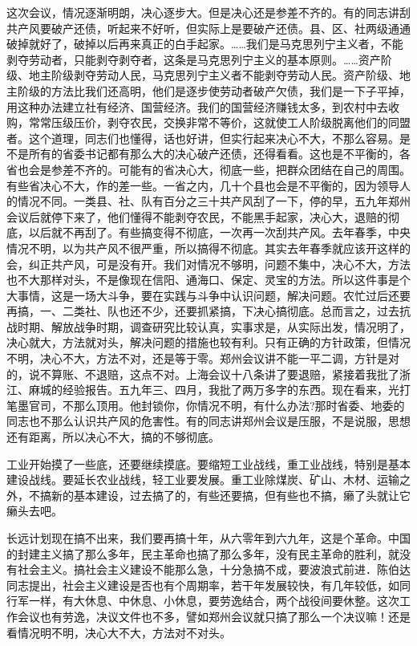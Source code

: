 这次会议，情况逐渐明朗，决心逐步大。但是决心还是参差不齐的。有的同志讲刮共产风要破产还债，听起来不好听，但实际上是要破产还债。县、区、社两级通通破掉就好了，破掉以后再来真正的白手起家。……我们是马克思列宁主义者，不能剥夺劳动者，只能剥夺剥夺者，这条是马克思列宁主义的基本原则。……资产阶级、地主阶级剥夺劳动人民，马克思列宁主义者不能剥夺劳动人民。资产阶级、地主阶级的方法比我们还高明，他们是逐步使劳动者破产欠债，我们是一下子平掉，用这种办法建立社有经济、国营经济。我们的国营经济赚钱太多，到农村中去收购，常常压级压价，剥夺农民，交换非常不等价，这就使工人阶级脱离他们的同盟者。这个道理，同志们也懂得，话也好讲，但实行起来决心不大，不那么容易。是不是所有的省委书记都有那么大的决心破产还债，还得看看。这也是不平衡的，各省也会是参差不齐的。可能有的省决心大，彻底一些，把群众团结在自己的周围。有些省决心不大，作的差一些。一省之内，几十个县也会是不平衡的，因为领导人的情况不同。一类县、社、队有百分之三十共产风刮了一下，停的早，五九年郑州会议后就停下来了，他们懂得不能剥夺农民，不能黑手起家，决心大，退赔的彻底，以后就不再刮了。有些搞变得不彻底，一次再一次刮共产风。去年春季，中央情况不明，以为共产风不很严重，所以搞得不彻底。其实去年春季就应该开这样的会，纠正共产风，可是没有开。我们对情况不够明，问题不集中，决心不大，方法也不大那样对头，不是像现在信阳、通海口、保定、灵宝的方法。所以这件事是个大事情，这是一场大斗争，要在实践与斗争中认识问题，解决问题。农忙过后还要再搞，一、二类社、队也还不少，还要抓紧搞，下决心搞彻底。总而言之，过去抗战时期、解放战争时期，调查研究比较认真，实事求是，从实际出发，情况明了，决心就大，方法就对头，解决问题的措施也较有利。只有正确的方针政策，但情况不明，决心不大，方法不对，还是等于零。郑州会议讲不能一平二调，方针是对的，说不算账、不退赔，这点不对。上海会议十八条讲了要退赔，紧接着我批了浙江、麻城的经验报告。五九年三、四月，我批了两万多字的东西。现在看来，光打笔墨官司，不那么顶用。他封锁你，你情况不明，有什么办法?那时省委、地委的同志也不那么认识共产风的危害性。有的同志讲郑州会议是压服，不是说服，思想还有距离，所以决心不大，搞的不够彻底。

工业开始摸了一些底，还要继续摸底。要缩短工业战线，重工业战线，特别是基本建设战线。要延长农业战线，轻工业要发展。重工业除煤炭、矿山、木材、运输之外，不搞新的基本建设，过去搞了的，有些还要搞，但有些也不搞，癞了头就让它癞头去吧。

长远计划现在搞不出来，我们要再搞十年，从六零年到六九年，这是个革命。中国的封建主义搞了那么多年，民主革命也搞了那么多年，没有民主革命的胜利，就没有社会主义。搞社会主义建设不能那么急，十分急搞不成，要波浪式前进．陈伯达同志提出，社会主义建设是否也有个周期率，若干年发展较快，有几年较低，如同行军一样，有大休息、中休息、小休息，要劳逸结合，两个战役间要休整。这次工作会议也有劳逸，决议文件也不多，譬如郑州会议就只搞了那么一个决议嘛！还是看情况明不明，决心大不大，方法对不对头。

